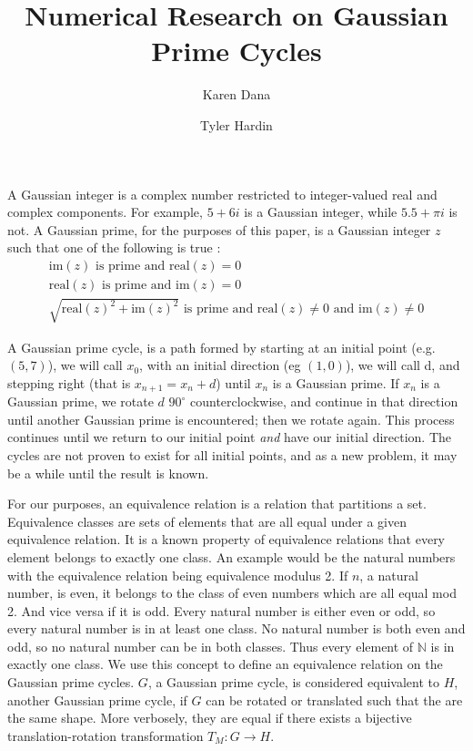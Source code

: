 \documentclass{article}
\title{Numerical Research on Gaussian Prime Cycles}
\author{Karen Dana \and Tyler Hardin}
\begin{document}
	\maketitle
	
A Gaussian integer is a complex number restricted to integer-valued real and complex components. For example, $5+6i$ is a Gaussian integer, while $5.5+\pi i$ is not. A Gaussian prime, for the purposes of this paper, is a Gaussian integer $z$ such that one of the following is true \cite{elem_num_thry}:
\begin{gather*}
  \mbox{im}(z) \mbox{ is prime and } \mbox{real}(z) = 0 \\
  \mbox{real}(z) \mbox{ is prime and } \mbox{im}(z) = 0 \\
  \sqrt{\mbox{real}(z)^2 + \mbox{im}(z)^2} \mbox{ is prime and } \mbox{real}(z) \neq 0 \mbox{ and } \mbox{im}(z) \neq 0
\end{gather*}
  
A Gaussian prime cycle, is a path formed by starting at an initial point (e.g. $(5,7)$), we will call $x_0$, with an initial direction (eg $(1,0)$), we will call d, and stepping right (that is $x_{n+1}=x_n + d$) until $x_n$ is a Gaussian prime. If $x_n$ is a Gaussian prime, we rotate $d$ $90^{\circ}$ counterclockwise, and continue in that direction until another Gaussian prime is encountered; then we rotate again. This process continues until we return to our initial point \textit{and} have our initial direction. The cycles are not proven to exist for all initial points, and as a new problem, it may be a while until the result is known. \cite{mathoverflow,wolfram}

For our purposes, an equivalence relation is a relation that partitions a set. 
Equivalence classes are sets of elements that are all equal under a given equivalence relation. It is a known property of equivalence relations that every element belongs to exactly one class.
An example would be the natural numbers with the equivalence relation being equivalence modulus 2.
If $n$, a natural number, is even, it belongs to the class of even numbers which are all equal mod 2.
And vice versa if it is odd. Every natural number is either even or odd, so every natural number is in at least one class. No natural number is both even and odd, so no natural number can be in both classes. Thus every element of $\mathbb{N}$ is in exactly one class.
We use this concept to define an equivalence relation on the Gaussian prime cycles.
$G$, a Gaussian prime cycle, is considered equivalent to $H$, another Gaussian prime cycle, if $G$ can be rotated or translated such that the are the same shape.
More verbosely, they are equal if there exists a bijective translation-rotation transformation $T_M:G \to H$.
\end{document}
